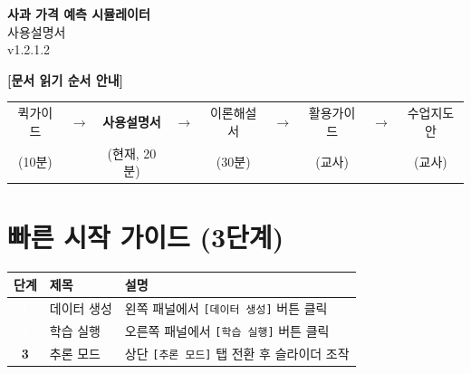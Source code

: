 \documentclass[11pt,a4paper]{article}
\begin{document}
\begin{center}
    {\Huge\bfseries\color{primaryblue} 사과 가격 예측 시뮬레이터}\\[8pt]
    {\Large 사용설명서}\\[6pt]
    {\large\color{textmedium} v1.2.1.2}\\[20pt]
\end{center}

\begin{guidebox}
\begin{center}
{\large\bfseries\color{primarygreen} [문서 읽기 순서 안내]}
\end{center}

\begin{center}
\begin{tabular}{ccccccccc}
퀵가이드 & $\rightarrow$ & \colorbox{accentyellow}{\textbf{사용설명서}} & $\rightarrow$ & 이론해설서 & $\rightarrow$ & 활용가이드 & $\rightarrow$ & 수업지도안 \\
(10분) & & (현재, 20분) & & (30분) & & (교사) & & (교사)
\end{tabular}
\end{center}
\end{guidebox}

\vspace{15pt}

\section*{빠른 시작 가이드 (3단계)}

\begin{center}
\begin{tabular}{|c|l|l|}
\hline
\rowcolor{bggreen}
\textbf{단계} & \textbf{제목} & \textbf{설명} \\
\hline
\cellcolor{primarygreen}\textcolor{white}{\textbf{1}} & 데이터 생성 & 왼쪽 패널에서 \texttt{[데이터 생성]} 버튼 클릭 \\
\hline
\cellcolor{primaryblue}\textcolor{white}{\textbf{2}} & 학습 실행 & 오른쪽 패널에서 \texttt{[학습 실행]} 버튼 클릭 \\
\hline
\cellcolor{accentyellow}\textcolor{textdark}{\textbf{3}} & 추론 모드 & 상단 \texttt{[추론 모드]} 탭 전환 후 슬라이더 조작 \\
\hline
\end{tabular}
\end{center}

\vspace{10pt}
\end{document}
